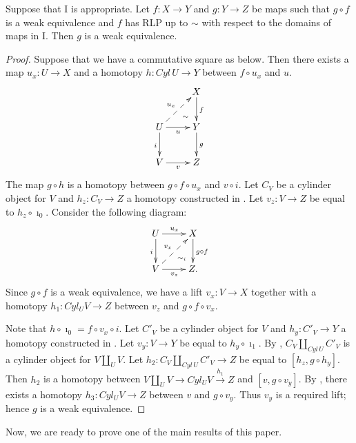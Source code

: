 \documentclass{amsart}
\theoremstyle{definition}
\newcommand{\I}{\mathrm{I}}
\begin{document}
\begin{lem}
Suppose that $\I$ is appropriate.
Let $f : X \to Y$ and $g : Y \to Z$ be maps such that $g \circ f$ is a weak equivalence
and $f$ has RLP up to $\sim$ with respect to the domains of maps in $\I$.
Then $g$ is a weak equivalence.
\end{lem}
\begin{proof}
Suppose that we have a commutative square as below.
Then there exists a map $u_x : U \to X$ and a homotopy $h : Cyl\,U \to Y$ between $f \circ u_x$ and $u$.
\[ \xymatrix{   \ar@{}[dr]|(.7){\sim}                & X \ar[d]^f \\
              U \ar@{-->}[ur]^{u_x} \ar[d]_i \ar[r]_u & Y \ar[d]^g \\
              V \ar[r]_v                             & Z
            } \]
The map $g \circ h$ is a homotopy between $g \circ f \circ u_x$ and $v \circ i$.
Let $C_V$ be a cylinder object for $V$ and $h_z : C_V \to Z$ a homotopy constructed in .
Let $v_z : V \to Z$ be equal to $h_z \circ \imath_0$.
Consider the following diagram:
\[ \xymatrix{ U \ar[r]^{u_x} \ar[d]_i \ar@{}[dr]|(.7){\sim_i} & X \ar[d]^{g \circ f} \\
              V \ar[r]_{v_z} \ar@{-->}[ur]^{v_x}              & Z.
            } \]
Since $g \circ f$ is a weak equivalence, we have a lift $v_x : V \to X$ together
with a homotopy $h_1 : Cyl_U V \to Z$ between $v_z$ and $g \circ f \circ v_x$.

Note that $h \circ \imath_0 = f \circ v_x \circ i$.
Let $C'_V$ be a cylinder object for $V$ and $h_y : C'_V \to Y$ a homotopy constructed in .
Let $v_y : V \to Y$ be equal to $h_y \circ \imath_1$.
By , $C_V \amalg_{Cyl\,U} C'_V$ is a cylinder object for $V \amalg_U V$.
Let $h_2 : C_V \amalg_{Cyl\,U} C'_V \to Z$ be equal to $[h_z, g \circ h_y]$.
Then $h_2$ is a homotopy between $V \amalg_U V \to Cyl_U V \overset{h_1}\to Z$ and $[v, g \circ v_y]$.
By , there exists a homotopy $h_3 : Cyl_U V \to Z$ between $v$ and $g \circ v_y$.
Thus $v_y$ is a required lift; hence $g$ is a weak equivalence.
\end{proof}

Now, we are ready to prove one of the main results of this paper.
\end{document}

